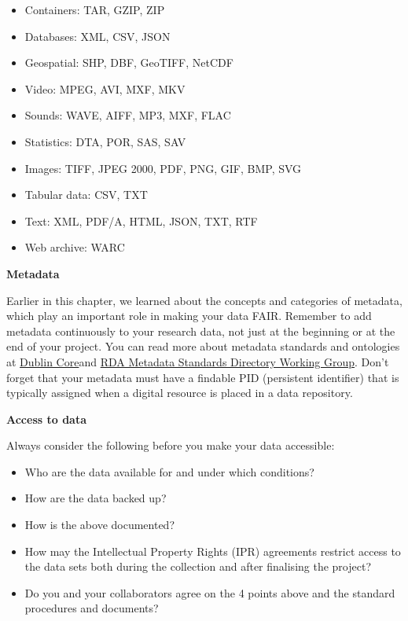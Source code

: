 \documentclass[
]{book}
\providecommand{\tightlist}{%
  \setlength{\itemsep}{0pt}\setlength{\parskip}{0pt}}
\begin{document}
\begin{itemize}
\tightlist
\item
  Containers: TAR, GZIP, ZIP
\item
  Databases: XML, CSV, JSON
\item
  Geospatial: SHP, DBF, GeoTIFF, NetCDF
\item
  Video: MPEG, AVI, MXF, MKV
\item
  Sounds: WAVE, AIFF, MP3, MXF, FLAC
\item
  Statistics: DTA, POR, SAS, SAV
\item
  Images: TIFF, JPEG 2000, PDF, PNG, GIF, BMP, SVG
\item
  Tabular data: CSV, TXT
\item
  Text: XML, PDF/A, HTML, JSON, TXT, RTF
\item
  Web archive: WARC
\end{itemize}

\textbf{Metadata}

Earlier in this chapter, we learned about the concepts and categories of metadata, which play an important role in making your data FAIR. Remember to add metadata continuously to your research data, not just at the beginning or at the end of your project. You can read more about metadata standards and ontologies at \href{https://www.dublincore.org/}{Dublin Core}and \href{http://rd-alliance.github.io/metadata-directory/}{RDA Metadata Standards Directory Working Group}. Don't forget that your metadata must have a findable PID (persistent identifier) that is typically assigned when a digital resource is placed in a data repository.

\textbf{Access to data}

Always consider the following before you make your data accessible:

\begin{itemize}
\tightlist
\item
  Who are the data available for and under which conditions?
\item
  How are the data backed up?
\item
  How is the above documented?
\item
  How may the Intellectual Property Rights (IPR) agreements restrict access to the data sets both during the collection and after finalising the project?
\item
  Do you and your collaborators agree on the 4 points above and the standard procedures and documents?
\end{itemize}
\end{document}
